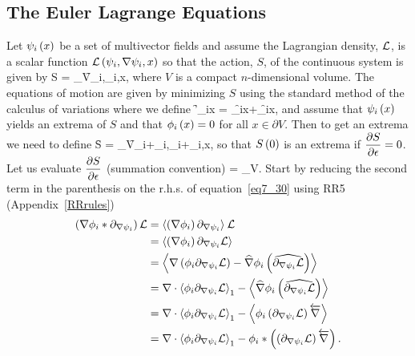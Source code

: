 \subsection{The Euler Lagrange Equations}
Let ${\psi_{i}}\left ( {x} \right )$ be a set of multivector fields and assume the Lagrangian density, $\mathcal{L}$, is a scalar function ${\mathcal{L}}\left ( {\psi_{i},\nabla\psi_{i},x} \right )$ so
that the action, $S$, of the continuous system is given by
\be
	S = \int_{V}\f{\Lf}{\psi_{i},\nabla\psi_{i},x},\label{eq7_27}
\ee
where $V$ is a compact $n$-dimensional volume.  The equations of motion are given by minimizing $S$ using the standard method of the calculus of 
variations where we define
\be
	\f{\psi'_{i}}{x} = \f{\psi_{i}}{x}+\epsilon\f{\phi_{i}}{x},
\ee
and assume that ${\psi_{i}}\left ( {x} \right )$ yields an extrema of $S$ and that ${\phi_{i}}\left ( {x} \right )=0$ for all $x\in\partial V$.  Then to get an extrema we need to define
\be
	\f{S}{\epsilon} = \int_{V}\f{\Lf}{\psi_{i}+\epsilon\phi_{i},\nabla\psi_{i}+\epsilon\nabla\phi_{i},x},
\ee
so that ${S}\left ( {0} \right )$ is an extrema if $\displaystyle\frac{\partial{S}}{\partial{\epsilon}} = 0$. Let us evaluate $\displaystyle\frac{\partial{S}}{\partial{\epsilon}}$ (summation convention)
\be
	 = \int_{V}.\label{eq7_30}
\ee
Start by reducing the second term in the parenthesis on the r.h.s. of equation~\ref{eq7_30} using RR5 (Appendix~\ref{RRrules})
\begin{align}
	\left ( {\nabla\phi_{i}*\partial_{\nabla\psi_{i}}} \right )\mathcal{L} &= \left \langle {\left ({\nabla\phi_{i}} \right )\partial_{\nabla\psi_{i}}} \right \rangle_{}\mathcal{L} \nonumber \\
	                                                    &= \left \langle {\left ({\nabla\phi_{i}} \right )\partial_{\nabla\psi_{i}}\mathcal{L}} \right \rangle_{} \nonumber \\
	                                                    &= \left \langle {\nabla\left ({\phi_{i}\partial_{\nabla\psi_{i}}\mathcal{L}} \right )-\widehat{\nabla}\phi_{i}\left ({\widehat{\partial_{\nabla\psi_{i}}\mathcal{L}}} \right )} \right \rangle_{} \nonumber \\
	                                                    &= \nabla\cdot\left \langle {\phi_{i}\partial_{\nabla\psi_{i}}\mathcal{L}} \right \rangle_{1}
	                                                       -\left \langle {\widehat{\nabla}\phi_{i}\left ({\widehat{\partial_{\nabla\psi_{i}}\mathcal{L}}} \right )} \right \rangle_{} \nonumber \\
	                                                    &= \nabla\cdot\left \langle {\phi_{i}\partial_{\nabla\psi_{i}}\mathcal{L}} \right \rangle_{1}
	                                                       -\left \langle {\phi_{i}\left ({\partial_{\nabla\psi_{i}}\mathcal{L}} \right )\overleftarrow{\nabla}} \right \rangle_{}  \nonumber \\   
	                                                    &= \nabla\cdot\left \langle {\phi_{i}\partial_{\nabla\psi_{i}}\mathcal{L}} \right \rangle_{1}
	                                                       -\phi_{i}*\left ( {\left ( {\partial_{\nabla\psi_{i}}\mathcal{L}} \right )\overleftarrow{\nabla}} \right ).
\end{align}
